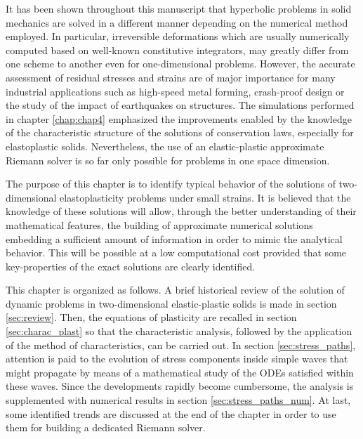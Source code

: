 It has been shown throughout this manuscript that hyperbolic problems in solid mechanics are solved in a different manner depending on the numerical method employed. 
In particular, irreversible deformations which are usually numerically computed based on well-known constitutive integrators, may greatly differ from one scheme to another even for one-dimensional problems.
However, the accurate assessment of residual stresses and strains are of major importance for many industrial applications such as high-speed metal forming, crash-proof design or the study of the impact of earthquakes on structures.
The simulations performed in chapter \ref{chap:chap4} emphasized the improvements enabled by the knowledge of the characteristic structure of the solutions of conservation laws, especially for elastoplastic solids.
Nevertheless, the use of an elastic-plastic approximate Riemann solver is so far only possible for problems in one space dimension.

The purpose of this chapter is to identify typical behavior of the solutions of two-dimensional elastoplasticity problems under small strains.
It is believed that the knowledge of these solutions will allow, through the better understanding of their mathematical features, the building of approximate numerical solutions embedding a sufficient amount of information in order to mimic the analytical behavior.
This will be possible at a low computational cost provided that some key-properties of the exact solutions are clearly identified. 

This chapter is organized as follows.
A brief historical review of the solution of dynamic problems in two-dimensional elastic-plastic solids is made in section \ref{sec:review}.
Then, the equations of plasticity are recalled in section \ref{sec:charac_plast} so that the characteristic analysis, followed by the application of the method of characteristics, can be carried out.
In section \ref{sec:stress_paths}, attention is paid to the evolution of stress components inside simple waves that might propagate by means of a mathematical study of the ODEs satisfied within these waves.
Since the developments rapidly become cumbersome, the analysis is supplemented with numerical results in section \ref{sec:stress_paths_num}.
At last, some identified trends are discussed at the end of the chapter in order to use them for building a dedicated Riemann solver. 

